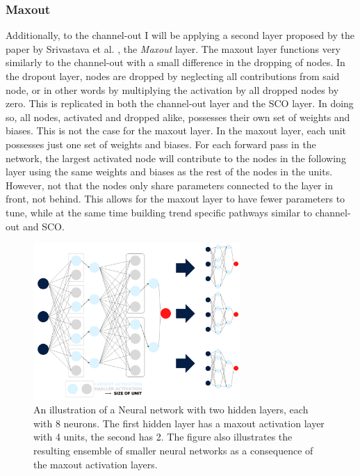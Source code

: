 \subsubsection*{Maxout}\label{subsubsec:maxout} 
Additionally, to the channel-out I will be applying a second layer proposed by the paper by Srivastava et al. \cite{wang_maxout_2013}, 
the \emph{Maxout} layer. The maxout layer functions very similarly to the channel-out with a small difference in the dropping of nodes. 
In the dropout layer, nodes are dropped by neglecting all contributions from said node, or in other words by multiplying the activation 
by all dropped nodes by zero. This is replicated in both the channel-out layer and the \ac{SCO} layer. In doing so, all nodes, activated 
and dropped alike, possesses their own set of weights and biases. This is not the case for the maxout layer.
In the maxout layer, each unit possesses just one set of weights and biases. For each forward pass in the network, the largest activated 
node will contribute to the nodes in the following layer using the same weights and biases as the rest of the nodes in the units. However, not 
that the nodes only share parameters connected to the layer in front, not behind. This allows for the maxout layer to have fewer parameters to 
tune, while at the same time building trend specific pathways similar to channel-out and \ac{SCO}. \\
\begin{figure}
    \centering
    \includegraphics[width=0.7\textwidth]{Figures/Illustrations/Max_out.png}
    \caption{An illustration of a Neural network with two hidden layers, each with 8 neurons.
    The first hidden layer has a maxout activation layer with 4 units, the second has 2.
    The figure also illustrates  the resulting ensemble of smaller neural networks as a consequence
    of the maxout activation layers. }
    \label{fig:Max_out}
\end{figure}
